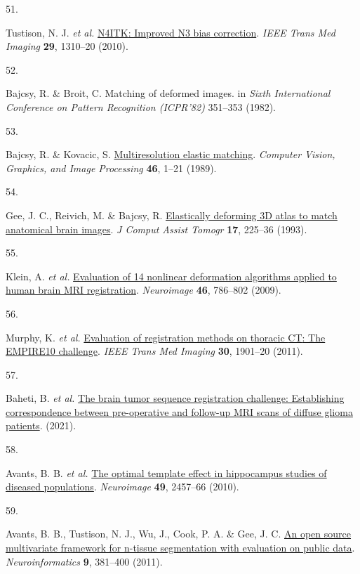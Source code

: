 \documentclass[
  12pt,
]{article}
\newlength{\cslhangindent}
\newlength{\csllabelwidth}
\newenvironment{CSLReferences}[2] %
 {\begin{list}{}{%
  \setlength{\itemindent}{0pt}
  \setlength{\leftmargin}{0pt}
  \setlength{\parsep}{0pt}
  \ifodd #1
   \setlength{\leftmargin}{\cslhangindent}
   \setlength{\itemindent}{-1\cslhangindent}
  \fi
  \setlength{\itemsep}{#2\baselineskip}}}
 {\end{list}}
\newcommand{\CSLLeftMargin}[1]{\parbox[t]{\csllabelwidth}{\strut#1\strut}}
\newcommand{\CSLRightInline}[1]{\parbox[t]{\linewidth - \csllabelwidth}{\strut#1\strut}}
\begin{document}
\begin{CSLReferences}{0}{0}
\CSLLeftMargin{51. }%
\CSLRightInline{Tustison, N. J. \emph{et al.}
\href{https://doi.org/10.1109/TMI.2010.2046908}{{N4ITK}: Improved {N3}
bias correction}. \emph{IEEE Trans Med Imaging} \textbf{29}, 1310--20
(2010).}

\CSLLeftMargin{52. }%
\CSLRightInline{Bajcsy, R. \& Broit, C. Matching of deformed images. in
\emph{{S}ixth {I}nternational {C}onference on {P}attern {R}ecognition
({ICPR}'82)} 351--353 (1982).}

\CSLLeftMargin{53. }%
\CSLRightInline{Bajcsy, R. \& Kovacic, S.
\href{https://doi.org/10.1016/S0734-189X(89)80014-3}{Multiresolution
elastic matching}. \emph{Computer Vision, Graphics, and Image
Processing} \textbf{46}, 1--21 (1989).}

\CSLLeftMargin{54. }%
\CSLRightInline{Gee, J. C., Reivich, M. \& Bajcsy, R.
\href{https://doi.org/10.1097/00004728-199303000-00011}{Elastically
deforming 3D atlas to match anatomical brain images}. \emph{J Comput
Assist Tomogr} \textbf{17}, 225--36 (1993).}

\CSLLeftMargin{55. }%
\CSLRightInline{Klein, A. \emph{et al.}
\href{https://doi.org/10.1016/j.neuroimage.2008.12.037}{Evaluation of 14
nonlinear deformation algorithms applied to human brain MRI
registration}. \emph{Neuroimage} \textbf{46}, 786--802 (2009).}

\CSLLeftMargin{56. }%
\CSLRightInline{Murphy, K. \emph{et al.}
\href{https://doi.org/10.1109/TMI.2011.2158349}{Evaluation of
registration methods on thoracic {CT}: The {EMPIRE10} challenge}.
\emph{IEEE Trans Med Imaging} \textbf{30}, 1901--20 (2011).}

\CSLLeftMargin{57. }%
\CSLRightInline{Baheti, B. \emph{et al.}
\href{https://arxiv.org/abs/2112.06979}{The brain tumor sequence
registration challenge: Establishing correspondence between
pre-operative and follow-up MRI scans of diffuse glioma patients}.
(2021).}

\CSLLeftMargin{58. }%
\CSLRightInline{Avants, B. B. \emph{et al.}
\href{https://doi.org/10.1016/j.neuroimage.2009.09.062}{The optimal
template effect in hippocampus studies of diseased populations}.
\emph{Neuroimage} \textbf{49}, 2457--66 (2010).}

\CSLLeftMargin{59. }%
\CSLRightInline{Avants, B. B., Tustison, N. J., Wu, J., Cook, P. A. \&
Gee, J. C. \href{https://doi.org/10.1007/s12021-011-9109-y}{An open
source multivariate framework for n-tissue segmentation with evaluation
on public data}. \emph{Neuroinformatics} \textbf{9}, 381--400 (2011).}


\end{CSLReferences}
\end{document}
